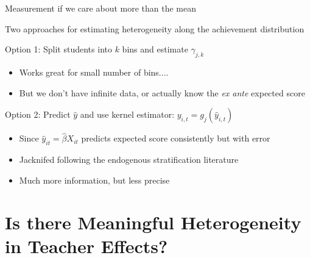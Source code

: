 \documentclass[t,aspectratio=169,11pt]{beamer}
\begin{document}
\begin{frame}{Measurement if we care about more than the mean}

\begin{wideitemize}
    \item Two approaches for estimating heterogeneity along the achievement distribution
    
    \item<2-> Option 1: Split students into $k$ bins and estimate $\gamma_{j,k}$ 
    \begin{itemize}
        \item Works great for small number of bins....
        \item But we don't have infinite data, or actually know the \textit{ex ante} expected score
    \end{itemize}

    \item<3-> Option 2: Predict $\hat{y}$ and use kernel estimator:  $y_{i,t}=g_j(\hat{y}_{i,t})$
    \begin{itemize}
        \item Since $\hat{y}_{it} = \hat{\beta} X_{it}$  predicts expected score consistently but with error
        \item Jacknifed following the endogenous stratification literature \citep{abadie2018endogenous}
        \item Much more information, but less precise
    \end{itemize}

\end{wideitemize}

\end{frame}





\section{Is there Meaningful Heterogeneity in Teacher Effects?}


\end{document}

